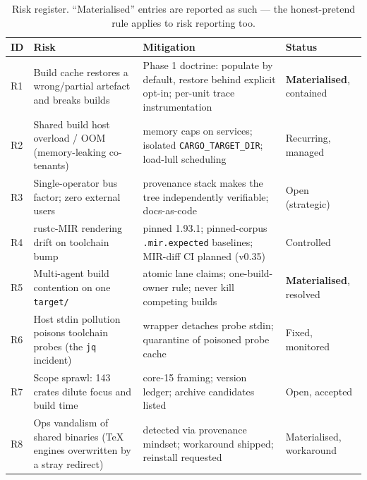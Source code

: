 \begin{table}[h]
\centering
\small
\begin{tabular}{@{}p{0.4cm}p{4.6cm}p{5.6cm}p{3.6cm}@{}}
\toprule
\textbf{ID} & \textbf{Risk} & \textbf{Mitigation} & \textbf{Status} \\
\midrule
R1 & Build cache restores a wrong/partial artefact and breaks builds & Phase 1 doctrine: populate by default, restore behind explicit opt-in; per-unit trace instrumentation & \textbf{Materialised}, contained \\
R2 & Shared build host overload / OOM (memory-leaking co-tenants) & memory caps on services; isolated \texttt{CARGO\_TARGET\_DIR}; load-lull scheduling & Recurring, managed \\
R3 & Single-operator bus factor; zero external users & provenance stack makes the tree independently verifiable; docs-as-code & Open (strategic) \\
R4 & rustc-MIR rendering drift on toolchain bump & pinned 1.93.1; pinned-corpus \texttt{.mir.expected} baselines; MIR-diff CI planned (v0.35) & Controlled \\
R5 & Multi-agent build contention on one \texttt{target/} & atomic lane claims; one-build-owner rule; never kill competing builds & \textbf{Materialised}, resolved \\
R6 & Host stdin pollution poisons toolchain probes (the \texttt{jq} incident) & wrapper detaches probe stdin; quarantine of poisoned probe cache & Fixed, monitored \\
R7 & Scope sprawl: 143 crates dilute focus and build time & core-15 framing; version ledger; archive candidates listed & Open, accepted \\
R8 & Ops vandalism of shared binaries (TeX engines overwritten by a stray redirect) & detected via provenance mindset; workaround shipped; reinstall requested & Materialised, workaround \\
\bottomrule
\end{tabular}
\caption{Risk register. ``Materialised'' entries are reported as such --- the honest-pretend rule applies to risk reporting too.}
\label{tab:risks}
\end{table}


